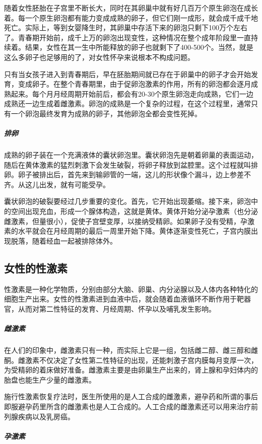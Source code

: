 \begin{enumerate}
随着女性胚胎在子宫里不断长大，同时在其卵巢中就有好几百万个原生卵泡在成长着。每一个原生卵泡都有能力变成成熟的卵子，但它们刚一成形，就会成千成千地死亡。实际上，等到女婴降生时，其卵巢中存活下来的卵泡只剩下100万个左右了。青春期开始前，成千上万的卵泡出现变性，这种情况在整个成年阶段里一直持续着。结果，女性在其一生中所能释放的卵子也就剩下了400-500个。当然，就是这么多卵子也足够用的了，对女性怀孕来说根本不构成问题。

只有当女孩子进入到青春期后，早在胚胎期间就已存在于卵巢中的卵子才会开始发育，变成卵子。在整个青春期里，由于促卵泡激素的作用，所有的卵泡都会逐月成熟起来。每个月月经周期开始前后，都会有20-30个原生卵泡走向成熟，它们一边成熟还一边生成着雌激素。卵泡的成熟是一个复杂的过程，在这个过程里，通常只有一个卵泡最终发育为成熟的卵子，其他卵泡全都会变性死掉。

\subparagraph{排卵}

成熟的卵子装在一个充满液体的囊状卵泡里。囊状卵泡先是朝着卵巢的表面运动，随后在黄体激素的猛烈刺激下会发生破裂，将卵子释放到盆腔里。这个过程就叫排卵。卵子被排出后，首先来到输卵管的一端，这儿的形状像个漏斗，边上参差不齐。从这儿出发，就有可能受孕。

囊状卵泡的破裂要经过几步重要的变化。首先，它开始出现萎缩。接下来，卵泡中的空间出现充血，形成一个腺体构造，这就是黄体。黄体开始分泌孕激素（也分泌雌激素，但量很小），促使子宫壁变厚，以接纳受精卵。如果卵子没有受精，孕激素的水平就会在月经周期的最后一周里开始下降。黄体逐渐变性死亡，子宫内膜出现脱落，随着经血一起被排除体外。

\subsection{女性的性激素}

性激素是一种化学物质，分别由部分大脑、卵巢、内分泌腺以及人体内各种特化的细胞生产出来。女性的性激素进到血液中后，就会随着血液循环不断作用于靶器官，从而对第二性特征的发育、月经周期、怀孕以及哺乳发生影响。

\subparagraph{雌激素}

在人们的印象中，雌激素只有一种，而实际上它是一组，包括雌二醇、雌三醇和雌酮。雌激素不仅决定了女性第二性特征的出现，还能刺激子宫内膜每月变厚一次，为受精卵的着床做好准备。雌激素主要是由卵巢生产出来的，肾上腺和孕妇体内的胎盘也能生产少量的雌激素。

施行性激素恢复疗法时，医生所使用的是人工合成的雌激素，避孕药和所谓的事后即服避孕药里所含的雌激素也是人工合成的。人工合成的雌激素还可以用来治疗前列腺疾病以及乳房癌。

\subparagraph{孕激素}


\end{enumerate}
